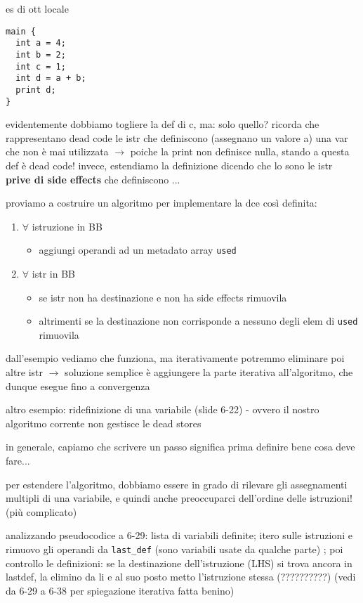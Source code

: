 \begin{example}[frametitle={dead code elimination}]
  es di ott locale
  \begin{lstlisting}
main {
  int a = 4;
  int b = 2;
  int c = 1;
  int d = a + b;
  print d;
}\end{lstlisting}
 evidentemente dobbiamo togliere la def di c, ma: solo quello? ricorda che rappresentano dead code le istr che definiscono (assegnano un valore a) una var che non \`e mai utilizzata $\rightarrow$ poiche la print non definisce nulla, stando a questa def \`e dead code! invece, estendiamo la definizione dicendo che lo sono le istr \textbf{prive di side effects} che definiscono ... 


  proviamo a costruire un algoritmo per implementare la dce cos\`i definita:
  \begin{enumerate}
    \item $\forall$ istruzione in BB
    \begin{itemize}
      \item aggiungi operandi ad un metadato array \lstinline|used|
    \end{itemize}
    \item $\forall$ istr in BB
    \begin{itemize}
      \item se istr non ha destinazione e non ha side effects rimuovila
      \item altrimenti se la destinazione non corrisponde a nessuno degli elem di \lstinline|used| rimuovila
    \end{itemize} 
  \end{enumerate}

  dall'esempio vediamo che funziona, ma iterativamente potremmo eliminare poi altre istr $\rightarrow$ soluzione semplice \`e aggiungere la parte iterativa all'algoritmo, che dunque esegue fino a convergenza
  
\end{example}

\begin{example}
    altro esempio: ridefinizione di una variabile (slide 6-22) - ovvero il nostro algoritmo corrente non gestisce le dead stores

    \begin{emphasize}
      in generale, capiamo che scrivere un passo significa prima definire bene cosa deve fare...
    \end{emphasize}
    
    per estendere l'algoritmo, dobbiamo essere in grado di rilevare gli assegnamenti multipli di una variabile, e quindi anche preoccuparci dell'ordine delle istruzioni! (pi\`u complicato)

    analizzando pseudocodice a 6-29: lista di variabili definite; itero sulle istruzioni e rimuovo gli operandi da \lstinline|last_def| (sono variabili usate da qualche parte) ; poi controllo le definizioni: se la destinazione dell'istruzione (LHS) si trova ancora in lastdef, la elimino da li e al suo posto metto l'istruzione stessa (??????????) (vedi da 6-29 a 6-38 per spiegazione iterativa fatta benino)
\end{example}

